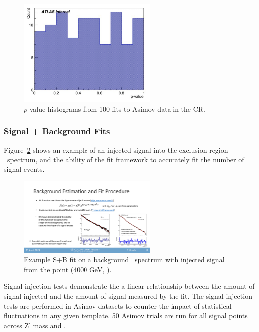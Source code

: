 \begin{figure}[!htbp]
\centering
   \includegraphics[width=0.6\textwidth]{figures/stats/asimov_cr_hist}
    \caption{$p$-value histograms from 100 fits to Asimov data in the CR. %
    \label{fig:asimov_hist}}
\end{figure}

\clearpage
\subsubsection{Signal + Background Fits}
\label{subsec:fit_splusb}

Figure~\ref{fig:splusb_sigInj} shows an example of an injected signal into the exclusion region \mt~spectrum, and the ability of the fit framework to accurately fit the number of signal events.
\begin{figure}[!htbp]
\centering
   \includegraphics[width=0.6\textwidth]{figures/stats/splusb_sigInj}
    \caption{Example S+B fit on a background \mt~spectrum with injected signal from the point (4000 GeV, ).
    \label{fig:splusb_sigInj}}
\end{figure}

Signal injection tests demonstrate the a linear relationship between the amount of signal injected and the amount of signal measured by the fit.
The signal injection tests are performed in Asimov datasets to counter the impact of statistical fluctuations in any given template.
50 Asimov trials are run for all signal points across Z' mass and \rinv.

